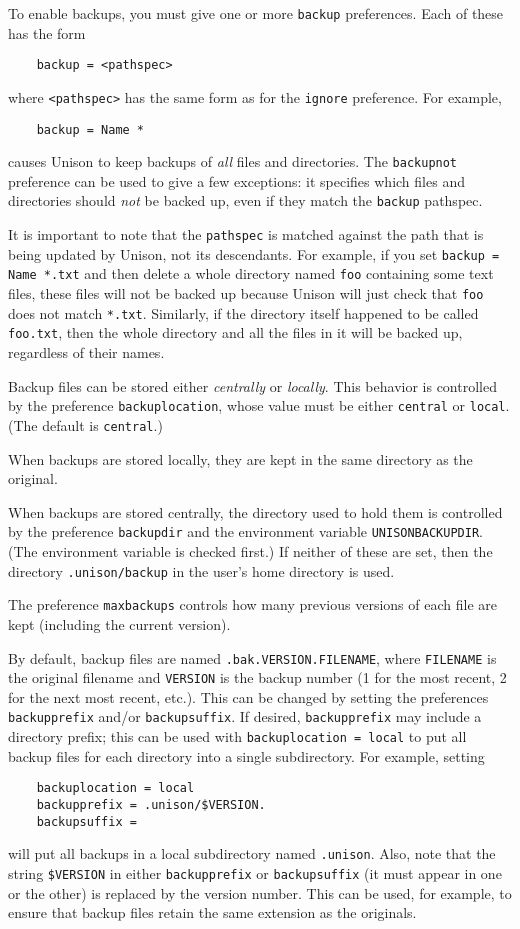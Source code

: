 \documentclass{article}
\begin{document}
To enable backups, you must give one or more \verb|backup| preferences.
Each of these has the form
\begin{verbatim}
    backup = <pathspec>
\end{verbatim}
where \verb|<pathspec>| has the same form as for the \verb|ignore|
preference.  For example,
\begin{verbatim}
    backup = Name *
\end{verbatim}
causes Unison to keep backups of {\em all} files and directories.  The
\verb|backupnot| preference can be used to give a few exceptions: it
specifies which files and directories should {\em not} be backed up, even if
they match the \verb|backup| pathspec.

It is important to note that the \verb|pathspec| is matched against the path
that is being updated by Unison, not its descendants.  For example, if you
set \verb|backup = Name *.txt| and then delete a whole directory named
\verb|foo| containing some text files, these files will not be backed up
because Unison will just check that \verb|foo| does not match \verb|*.txt|.
Similarly, if the directory itself happened to be called \verb|foo.txt|,
then the whole directory and all the files in it will be backed up,
regardless of their names.

Backup files can be stored either {\em centrally} or {\em locally}.  This
behavior is controlled by the preference \verb|backuplocation|, whose value
must be either \verb|central| or \verb|local|.  (The default is
\verb|central|.)

When backups are stored locally, they are kept in the same
directory as the original.

When backups are stored centrally, the directory used to hold them is
controlled by the preference \verb|backupdir| and the
environment variable \verb|UNISONBACKUPDIR|.  (The environment variable is
checked first.)  If neither of these are set, then the directory
\verb|.unison/backup| in the user's home directory is used.

The preference \verb|maxbackups| controls how many previous versions of
each file are kept (including the current version).

By default, backup files are named \verb|.bak.VERSION.FILENAME|,
where \verb|FILENAME| is the original filename and \verb|VERSION| is the
backup number (1 for the most recent, 2 for the next most recent,
etc.).  This can be changed by setting the preferences \verb|backupprefix|
and/or \verb|backupsuffix|.  If desired, \verb|backupprefix| may include a
directory prefix; this can be used with \verb|backuplocation = local| to put all
backup files for each directory into a single subdirectory.  For example, setting
\begin{verbatim}
    backuplocation = local
    backupprefix = .unison/$VERSION.
    backupsuffix =
\end{verbatim}
will put all backups in a local subdirectory named \verb|.unison|.  Also,
note that the string \verb|$VERSION| in either \verb|backupprefix| or
\verb|backupsuffix| (it must appear in one or the other) is replaced by
the version number.  This can be used, for example, to ensure that backup
files retain the same extension as the originals.
\end{document}
